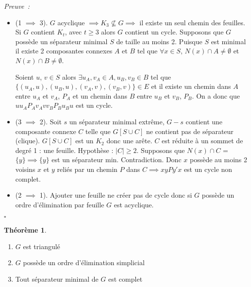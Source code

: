 \documentclass{book}
\theoremstyle{definition}
\newtheorem{theorem}{Théorème}
\numberwithin{lemma}{subsection}
\numberwithin{theorem}{subsection}
\numberwithin{definition}{subsection}
\numberwithin{proposition}{subsection}
\numberwithin{corollary}{subsection}
\numberwithin{property}{subsection}
\numberwithin{example}{subsection}
\numberwithin{heuristique}{subsection}
\numberwithin{scenario}{subsection}
\newenvironment{proofi} {\noindent\emph{Preuve~:}} {\hfill $\square$\vspace{0.2cm}}
\begin{document}
\begin{proofi}
\begin{itemize}
    \item (1 $\implies$ 3). $G$ acyclique $\implies K_3 \nsubseteq G \implies$ il existe un seul chemin des feuilles. Si $G$ contient $K_t$, avec $t \geqslant 3$ alors $G$ contient un cycle. Supposons que $G$ possède un séparateur minimal $S$ de taille au moins 2.
    Puisque $S$ est minimal il existe 2 composantes connexes $A$ et $B$ tel que $\forall x \in S$, $N(x) \cap A \neq  \emptyset$ et $N(x) \cap B \neq  \emptyset$. 
    
    Soient $u$, $v \in S$ alors $\exists u_A, v_A \in A, u_B, v_B \in B$ tel que $\{(u_A, u), (u_B, u), (v_A, v), (v_B, v)\} \in E $ et il existe un chemin dans $A$ entre $u_A$ et $v_A$, $P_A$ et un chemin dans $B$ entre $u_B$ et $v_B$, $P_B$. On a donc que $uu_AP_Av_Avv_BP_Bu_Bu$ est un cycle.
    \item (3 $\implies$ 2). Soit $s$ un séparateur minimal extrême, $G-s$ contient une composante connexe $C$ telle que $G[S \cup C]$ ne contient pas de séparateur (clique). $G[S \cup C]$ est un $K_2$ donc une arête. $C$ est réduite à un sommet de degré 1 : une feuille.
    Hypothèse : $|C| \geqslant 2$. Supposons que $N(x) \cap C$ = $\{ y \} \implies \{ y \}$ est un séparateur min. Contradiction. Donc $x$ possède au moins 2 voisins $x$ et $y$ reliés par un chemin $P$ dans $C \implies xyPy\prime x$ est un cycle non complet.
    \item (2 $\implies$ 1). Ajouter une feuille ne créer pas de cycle donc si $G$ possède un ordre d'élimination par feuille $G$ est acyclique.
\end{itemize}
\end{proofi}
  
\begin{theorem}
  \begin{enumerate}
        \item $G$ est triangulé
        \item $G$ possède un ordre d'élimination simplicial
        \item Tout séparateur minimal de $G$ est complet
    \end{enumerate}
\end{theorem}
\end{document}
